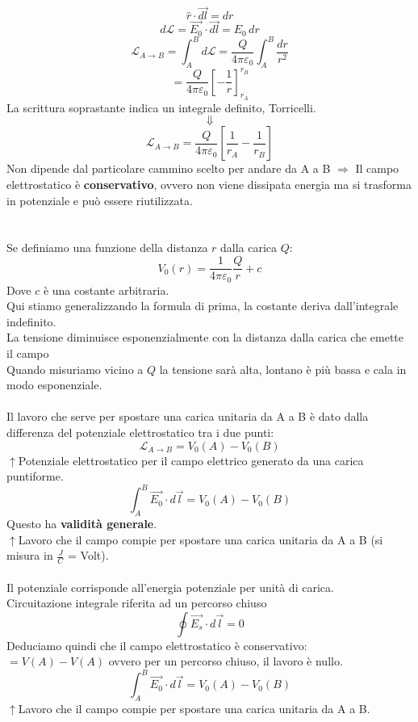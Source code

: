 \documentclass[../main.tex]{subfiles}
\begin{document}
	$$ \hat{r} \cdot \vec{dl} = dr $$
	$$ d\mathscr{L} = \vec{E_0} \cdot \vec{dl} = E_0 \,dr $$
	$$  \mathscr{L}_{A \rightarrow B} = \int_{A}^{B} d\mathscr{L} = \frac{Q}{4\pi \varepsilon_0} \int_{A}^{B} \frac{dr}{r^2}  $$
	$$ = \frac{Q}{4\pi \varepsilon_0} \left[ -\frac{1}{r} \right]_{r_A}^{r_B}  $$
	La scrittura soprastante indica un integrale definito, Torricelli.
	$$ \Downarrow$$
	$$\boxed{ \mathscr{L}_{A \rightarrow B} = \frac{Q}{4\pi \varepsilon_0} \left[ \frac{1}{r_A} - \frac{1}{r_B} \right]} $$
	Non dipende dal particolare cammino scelto per andare da A a B $\Rightarrow$ Il campo elettrostatico è \textbf{conservativo}, ovvero non viene dissipata energia ma si trasforma in potenziale e può essere riutilizzata.\\\\\\
	Se definiamo una funzione della distanza $r$ dalla carica $Q$:
	$$ V_0(r) = \frac{1}{4\pi \varepsilon_0} \frac{Q}{r} + c $$
	Dove $c$ è una costante arbitraria.\\
	Qui stiamo generalizzando la formula di prima, la costante deriva dall’integrale indefinito.\\
	La tensione diminuisce esponenzialmente con la distanza dalla carica che emette il campo\\
	Quando misuriamo vicino a $Q$ la tensione sarà alta, lontano è più bassa e cala in modo esponenziale.\\\\
	Il lavoro che serve per spostare una carica unitaria da A a B è dato dalla differenza del potenziale elettrostatico tra i due punti:
	$$ \mathcal{L}_{A \to B} = V_0(A) - V_0(B) $$
	$\uparrow$Potenziale elettrostatico per il campo elettrico generato da una carica puntiforme.
	$$ \boxed{\int_{A}^{B} \vec{E_0} \cdot d\vec{l} = V_0(A) - V_0(B)} $$
	Questo ha \textbf{validità generale}.\\
	$\uparrow$Lavoro che il campo compie per spostare una carica unitaria da A a B (si misura in $\frac{J}{C}$ = Volt).\\\\
	Il potenziale corrisponde all’energia potenziale per unità di carica.\\
	Circuitazione integrale riferita ad un percorso chiuso
	$$ \oint \vec{E_s} \cdot d\vec{l} = 0 $$
	Deduciamo quindi che il campo elettrostatico è conservativo:\\
	$ = V(A) - V(A) $ ovvero per un percorso chiuso, il lavoro è nullo.
	$$ \boxed{\int_{A}^{B} \vec{E_{0}} \cdot d\vec{l} = V_{0}(A) - V_{0}(B)} $$
	$\uparrow$Lavoro che il campo compie per spostare una carica unitaria da A a B.\\\\
\end{document}
